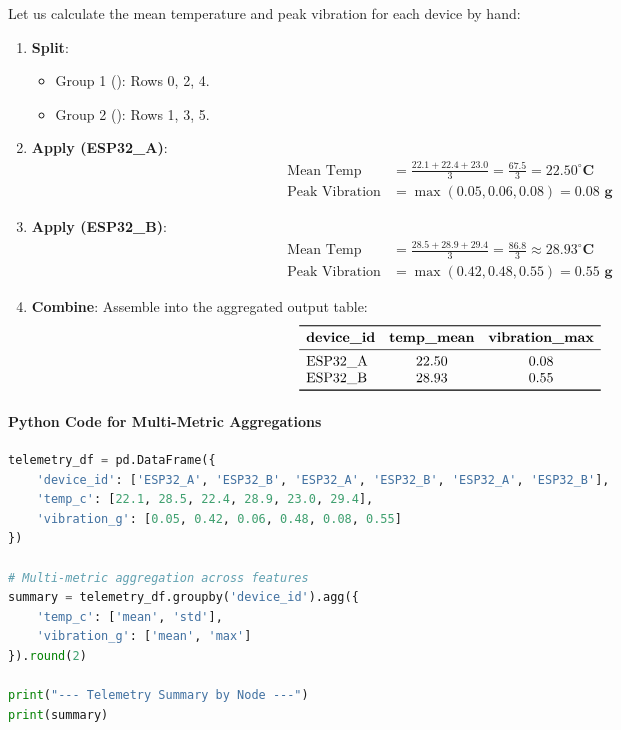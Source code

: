 Let us calculate the mean temperature and peak vibration for each device by hand:
\begin{enumerate}
    \item \textbf{Split}:
    \begin{itemize}
        \item Group 1 (): Rows 0, 2, 4.
        \item Group 2 (): Rows 1, 3, 5.
    \end{itemize}

    \item \textbf{Apply (ESP32\_A)}:
    \begin{align*}
    \text{Mean Temp} &= \frac{22.1 + 22.4 + 23.0}{3} = \frac{67.5}{3} = \mathbf{22.50^\circ\text{C}} \\
    \text{Peak Vibration} &= \max(0.05, 0.06, 0.08) = \mathbf{0.08\text{ g}}
    \end{align*}

    \item \textbf{Apply (ESP32\_B)}:
    \begin{align*}
    \text{Mean Temp} &= \frac{28.5 + 28.9 + 29.4}{3} = \frac{86.8}{3} \approx \mathbf{28.93^\circ\text{C}} \\
    \text{Peak Vibration} &= \max(0.42, 0.48, 0.55) = \mathbf{0.55\text{ g}}
    \end{align*}

    \item \textbf{Combine}: Assemble into the aggregated output table:
    \begin{equation*}
    \begin{array}{lcc}
    \toprule
    \textbf{device\_id} & \textbf{temp\_mean} & \textbf{vibration\_max} \\
    \midrule
    \text{ESP32\_A} & 22.50 & 0.08 \\
    \text{ESP32\_B} & 28.93 & 0.55 \\
    \bottomrule
    \end{array}
    \end{equation*}
\end{enumerate}

\paragraph{Python Code for Multi-Metric Aggregations}
\begin{lstlisting}[language=Python]
telemetry_df = pd.DataFrame({
    'device_id': ['ESP32_A', 'ESP32_B', 'ESP32_A', 'ESP32_B', 'ESP32_A', 'ESP32_B'],
    'temp_c': [22.1, 28.5, 22.4, 28.9, 23.0, 29.4],
    'vibration_g': [0.05, 0.42, 0.06, 0.48, 0.08, 0.55]
})

# Multi-metric aggregation across features
summary = telemetry_df.groupby('device_id').agg({
    'temp_c': ['mean', 'std'],
    'vibration_g': ['mean', 'max']
}).round(2)

print("--- Telemetry Summary by Node ---")
print(summary)
\end{lstlisting}

